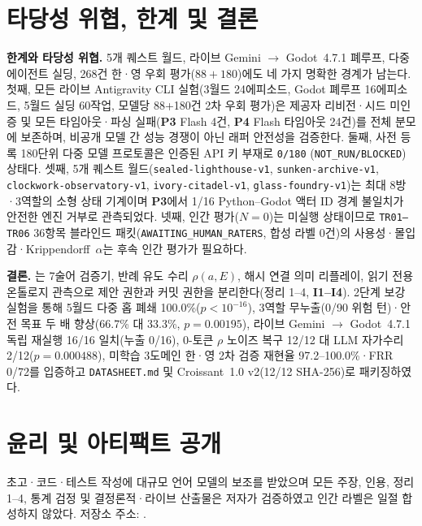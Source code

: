\FloatBarrier
\section{타당성 위협, 한계 및 결론}\label{sec:conclusion}
\textbf{한계와 타당성 위협.} 5개 퀘스트 월드, 라이브 Gemini $\rightarrow$ Godot~4.7.1 폐루프, 다중 에이전트 실딩, 268건 한·영 우회 평가($88+180$)에도 네 가지 명확한 경계가 남는다. 첫째, 모든 라이브 Antigravity CLI 실험(3월드 24에피소드, Godot 폐루프 16에피소드, 5월드 실딩 60작업, 모델당 88+180건 2차 우회 평가)은 제공자 리비전·시드 미인증 및 모든 타임아웃·파싱 실패(\textbf{P3} Flash 4건, \textbf{P4} Flash 타임아웃 24건)를 전체 분모에 보존하며, 비공개 모델 간 성능 경쟁이 아닌 래퍼 안전성을 검증한다. 둘째, 사전 등록 180단위 다중 모델 프로토콜은 인증된 API 키 부재로 \texttt{0/180} (\texttt{NOT\_RUN/BLOCKED}) 상태다. 셋째, 5개 퀘스트 월드(\texttt{sealed-\allowbreak lighthouse-\allowbreak v1}, \texttt{sunken-\allowbreak archive-\allowbreak v1}, \texttt{clockwork-\allowbreak observatory-\allowbreak v1}, \texttt{ivory-\allowbreak citadel-\allowbreak v1}, \texttt{glass-\allowbreak foundry-\allowbreak v1})는 최대 8방·3역할의 소형 상태 기계이며 \textbf{P3}에서 1/16 Python--Godot 액터 ID 경계 불일치가 안전한 엔진 거부로 관측되었다. 넷째, 인간 평가($N{=}0$)는 미실행 상태이므로 \texttt{TR01--TR06} 36항목 블라인드 패킷(\texttt{AWAITING\_}\allowbreak\texttt{HUMAN\_}\allowbreak\texttt{RATERS}, 합성 라벨 0건)의 사용성·몰입감·Krippendorff~$\alpha$는 후속 인간 평가가 필요하다.

\textbf{결론.} \system{}는 7술어 검증기, 반례 유도 수리 $\rho(a,E)$, 해시 연결 의미 리플레이, 읽기 전용 온톨로지 관측으로 제안 권한과 커밋 권한을 분리한다(정리 1--4, \textbf{I1--I4}). 2단계 보강 실험을 통해 5월드 다중 홉 폐쇄 100.0\%($p{<}10^{-16}$), 3역할 무누출(0/90 위험 턴)·안전 목표 두 배 향상(66.7\% 대 33.3\%, $p{=}0.00195$), 라이브 Gemini $\rightarrow$ Godot~4.7.1 독립 재실행 16/16 일치(누출 0/16), 0-토큰 $\rho$ 노이즈 복구 12/12 대 LLM 자가수리 2/12($p{=}0.000488$), 미학습 3도메인 한·영 2차 검증 재현율 97.2--100.0\%·FRR 0/72를 입증하고 \texttt{DATASHEET.md} 및 Croissant~1.0 v2(12/12 SHA-256)로 패키징하였다.

\section*{윤리 및 아티팩트 공개}
초고·코드·테스트 작성에 대규모 언어 모델의 보조를 받았으며 모든 주장, 인용, 정리 1--4, 통계 검정 및 결정론적·라이브 산출물은 저자가 검증하였고 인간 라벨은 일절 합성하지 않았다. 저장소 주소: \RepoURL.
